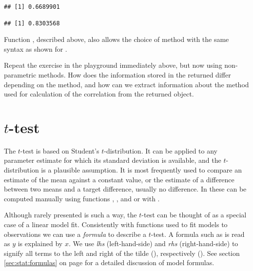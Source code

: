 \documentclass[krantz2]{krantz}\usepackage{knitr}
\begin{document}
\begin{knitrout}\footnotesize
{}\color{fgcolor}\begin{kframe}
\begin{alltt}
\hlstd{(} \hlopt{$}  \hlopt{$}  \hlstd{=} \hlstd{)}
\end{alltt}
\begin{verbatim}
## [1] 0.6689901
\end{verbatim}
\begin{alltt}
\hlstd{(} \hlopt{$}  \hlopt{$}  \hlstd{=} \hlstd{)}
\end{alltt}
\begin{verbatim}
## [1] 0.8303568
\end{verbatim}
\end{kframe}
\end{knitrout}

Function , described above, also allows the choice of method with the same syntax as shown for .

\begin{playground}
Repeat the exercise in the playground immediately above, but now using non-parametric methods. How does the information stored in the returned  differ depending on the method, and how can we extract information about the method used for calculation of the correlation from the returned object.
\end{playground}

\section{$t$-test}
The $t$-test is based on Student's $t$-distribution. It can be applied to any parameter estimate for which its standard deviation is available, and the $t$-distribution is a plausible assumption. It is most frequently used to compare an estimate of the mean against a constant value, or the estimate of a difference between two means and a target difference, usually no difference. In \Rlang these can be computed manually using functions , , and  or with .

Although rarely presented is such a way, the $t$-test can be thought of as a special case of a linear model fit. Consistently with functions used to fit models to observations we can use a \emph{formula} to describe a $t$-test. A formula such as  is read as $y$ is explained by $x$. We use \emph{lhs} (left-hand-side) and \emph{rhs} (right-hand-side) to signify all terms to the left and right of the tilde (), respectively (). See section \ref{sec:stat:formulas} on page \pageref{sec:stat:formulas} for a detailed discussion of model formulas.
\end{document}
